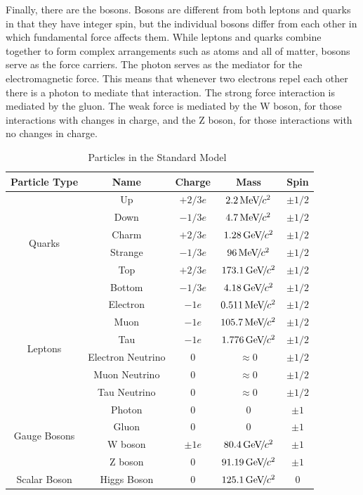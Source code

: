 Finally, there are the bosons. Bosons are different from both leptons and quarks in that they have integer spin, but the individual bosons differ from each other in which fundamental force affects them. While leptons and quarks combine together to form complex arrangements such as atoms and all of matter, bosons serve as the force carriers. The photon serves as the mediator for the electromagnetic force. This means that whenever two electrons repel each other there is a photon to mediate that interaction. The strong force interaction is mediated by the gluon. The weak force is mediated by the W boson, for those interactions with changes in charge, and the Z boson, for those interactions with no changes in charge. 

\begin{table}
\caption{Particles in the Standard Model~\cite{pdg}}
\label{tab:particles}
\begin{center}
\begin{tabular}{|c|c|c|c|c|}
\hline
Particle Type & Name & Charge & Mass & Spin \\
\hline
\multirow{6}{*}{Quarks} & Up & $+2/3e$ & $2.2{\,\text{Me\hspace{-.08em}V\hspace{-0.16em}/\hspace{-0.08em}}c^\text{2}}$ & $\pm 1/2$ \\
& Down & $-1/3e$ & $4.7{\,\text{Me\hspace{-.08em}V\hspace{-0.16em}/\hspace{-0.08em}}c^\text{2}}$ & $\pm 1/2$ \\
& Charm & $+2/3e$ & $1.28{\,\text{Ge\hspace{-.08em}V\hspace{-0.16em}/\hspace{-0.08em}}c^\text{2}}$ & $\pm 1/2$ \\
& Strange & $-1/3e$ & $96{\,\text{Me\hspace{-.08em}V\hspace{-0.16em}/\hspace{-0.08em}}c^\text{2}}$ & $\pm 1/2$ \\
& Top & $+2/3e$ & $173.1{\,\text{Ge\hspace{-.08em}V\hspace{-0.16em}/\hspace{-0.08em}}c^\text{2}}$ & $\pm 1/2$ \\
& Bottom & $-1/3e$ & $4.18{\,\text{Ge\hspace{-.08em}V\hspace{-0.16em}/\hspace{-0.08em}}c^\text{2}}$ & $\pm 1/2$ \\
\hline
\multirow{6}{*}{Leptons} & Electron & $-1e$ & $0.511{\,\text{Me\hspace{-.08em}V\hspace{-0.16em}/\hspace{-0.08em}}c^\text{2}}$ & $\pm 1/2$ \\
& Muon & $-1e$ & $105.7{\,\text{Me\hspace{-.08em}V\hspace{-0.16em}/\hspace{-0.08em}}c^\text{2}}$ & $\pm 1/2$ \\
& Tau & $-1e$ & $1.776{\,\text{Ge\hspace{-.08em}V\hspace{-0.16em}/\hspace{-0.08em}}c^\text{2}}$ & $\pm 1/2$ \\
& Electron Neutrino & $0$ & $\approx 0$ & $\pm 1/2$ \\
& Muon Neutrino & $0$ & $\approx 0$ & $\pm 1/2$ \\
& Tau Neutrino & $0$ & $\approx 0$ & $\pm 1/2$ \\
\hline
\multirow{4}{*}{Gauge Bosons} & Photon & 0 & 0 & $\pm 1$ \\
& Gluon & 0 & 0 & $\pm 1$ \\
& W boson & $\pm 1e$ & $80.4{\,\text{Ge\hspace{-.08em}V\hspace{-0.16em}/\hspace{-0.08em}}c^\text{2}}$ & $\pm 1$ \\
& Z boson & 0 & $91.19{\,\text{Ge\hspace{-.08em}V\hspace{-0.16em}/\hspace{-0.08em}}c^\text{2}}$ & $\pm 1$ \\
\hline
Scalar Boson & Higgs Boson & 0 & $125.1{\,\text{Ge\hspace{-.08em}V\hspace{-0.16em}/\hspace{-0.08em}}c^\text{2}}$ & 0 \\
\hline
\end{tabular}
\end{center}
\end{table} 
